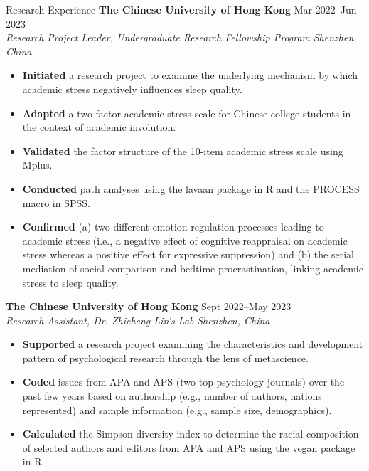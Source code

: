 \documentclass{resume} %
\begin{document}
\begin{rSection}{Research Experience}
\textbf{The Chinese University of Hong Kong} \hfill{Mar 2022--Jun 2023} \\
\textit{Research Project Leader, Undergraduate Research Fellowship Program} \hfill{\textit{Shenzhen, China}}
 \begin{itemize}
    \itemsep -5pt {} 
     \item \textbf{Initiated} a research project to examine the underlying mechanism by which academic stress negatively influences sleep quality.
     \item \textbf{Adapted} a two-factor academic stress scale for Chinese college students in the context of academic involution.
     \item \textbf{Validated} the factor structure of the 10-item academic stress scale using Mplus.
     \item \textbf{Conducted} path analyses using the lavaan package in R and the PROCESS macro in SPSS.
     \item \textbf{Confirmed} (a) two different emotion regulation processes leading to academic stress (i.e., a negative effect of cognitive reappraisal on academic stress whereas a positive effect for expressive suppression) and (b) the serial mediation of social comparison and bedtime procrastination, linking academic stress to sleep quality.
 \end{itemize}

\textbf{The Chinese University of Hong Kong} \hfill{Sept 2022--May 2023} \\
\textit{Research Assistant, Dr. Zhicheng Lin’s Lab} \hfill{\textit{Shenzhen, China}}
 \begin{itemize}
    \itemsep -5pt {} 
    \item \textbf{Supported} a research project examining the characteristics and development pattern of psychological research through the lens of metascience.
    \item \textbf{Coded} issues from APA and APS (two top psychology journals) over the past few years based on authorship (e.g., number of authors, nations represented) and sample information (e.g., sample size, demographics).
    \item \textbf{Calculated} the Simpson diversity index to determine the racial composition of selected authors and editors from APA and APS using the vegan package in R. 
 \end{itemize}


\end{rSection}
\end{document}
